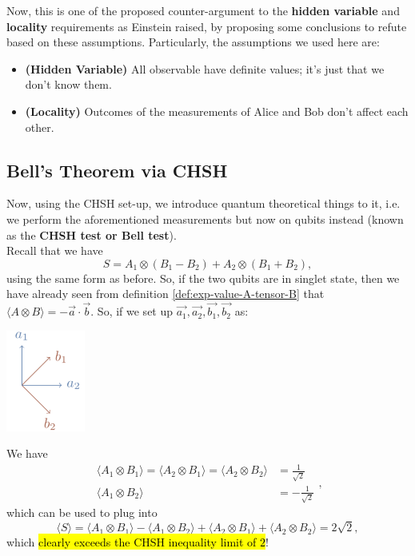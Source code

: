 \documentclass[12pt]{article}
\begin{document}
\begin{remark}
Now, this is one of the proposed counter-argument to the \textbf{hidden variable} and \textbf{locality} requirements as Einstein raised, by proposing some conclusions to refute based on these assumptions. Particularly, the assumptions we used here are:
\begin{itemize}
    \item \textbf{(Hidden Variable)} All observable have definite values; it's just that we don't know them.
    \item \textbf{(Locality)} Outcomes of the measurements of Alice and Bob don't affect each other.
\end{itemize}
\end{remark}

\subsection{Bell's Theorem via CHSH}
Now, using the CHSH set-up, we introduce quantum theoretical things to it, i.e. we perform the aforementioned measurements but now on qubits instead (known as the \textbf{CHSH test or Bell test}).\\

\noindent Recall that we have $$
S = A_1\otimes (B_1 - B_2) + A_2\otimes (B_1 + B_2),
$$ using the same form as before. So, if the two qubits are in singlet state, then we have already seen from definition \ref{def:exp-value-A-tensor-B} that  $\langle A\otimes B\rangle = -\vec{a}\cdot\vec{b}$. So, if we set up $\vec{a_1}, \vec{a_2}, \vec{b_1}, \vec{b_2}$ as:
\begin{center}
    \includegraphics[width = 7em]{images/1.jpg}
\end{center}
We have $$
\begin{aligned}
    \langle A_1 \otimes B_1 \rangle = \langle A_2 \otimes B_1 \rangle= \langle A_2 \otimes B_2 \rangle &= \frac{1}{\sqrt{2}}\\
    \langle A_1 \otimes B_2 \rangle &= -\frac{1}{\sqrt{2}}
\end{aligned},
$$ which can be used to plug into $$
\boxed{\langle S\rangle =} \langle A_1\otimes B_1 \rangle - \langle A_1\otimes B_2\rangle +\langle A_2\otimes B_1 \rangle+\langle A_2\otimes B_2\rangle \boxed{= 2\sqrt{2}},
$$ which \hl{clearly exceeds the CHSH inequality limit of $2$}!
\end{document}

